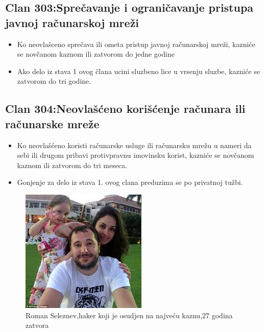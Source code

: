 \documentclass[a4paper]{article}
\begin{document}
\subsection{Clan 303:Sprečavanje i ograničavanje pristupa javnoj računarskoj mreži}
\begin{itemize}
	\item Ko neovlašceno sprečava ili ometa pristup javnoj računarskoj mreži, kazniće se novčanom kaznom ili zatvorom do jedne godine
	\item Ako delo iz stava 1 ovog člana ucini sluzbeno lice u vrsenju sluzbe, kazniće se zatvorom do tri godine.
\end{itemize}
\subsection{Clan 304:Neovlašćeno korišćenje računara ili računarske mreže}
\begin{itemize}
	\item Ko neovlašćeno koristi računarske usluge ili računarsku mrežu u nameri da sebi ili drugom pribavi protivpravnu imovinsku korist, kazniće se novčanom kaznom ili zatvorom do tri meseca.
	\item Gonjenje za delo iz stava 1. ovog clana preduzima se po privatnoj tužbi.
\end{itemize}
\begin{figure}[h!]
	\begin{center}
		\includegraphics[scale=0.30]{roman.jpeg}
	\end{center}
	\caption{Roman Seleznev,haker koji je osudjen na najveću kaznu,27 godina zatvora}
	\label{fig:roman}
\end{figure}
\newpage









 
\end{document}
